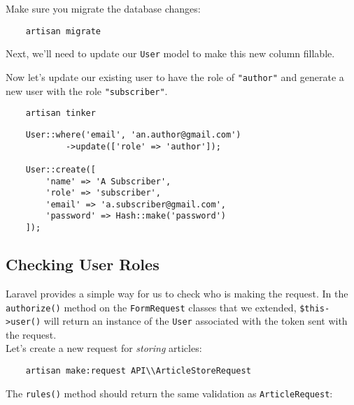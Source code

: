 Make sure you migrate the database changes:

\begin{verbatim}
    artisan migrate
\end{verbatim}

\pagebreak

Next, we'll need to update our \texttt{User} model to make this new column fillable.


Now let's update our existing user to have the role of \texttt{"author"} and generate a new user with the role \texttt{"subscriber"}.

\begin{verbatim}
    artisan tinker
\end{verbatim}

\begin{verbatim}
    User::where('email', 'an.author@gmail.com')
            ->update(['role' => 'author']);

    User::create([
        'name' => 'A Subscriber',
        'role' => 'subscriber',
        'email' => 'a.subscriber@gmail.com',
        'password' => Hash::make('password')
    ]);
\end{verbatim}


\subsection{Checking User Roles}

Laravel provides a simple way for us to check who is making the request. In the \texttt{authorize()} method on the \texttt{FormRequest} classes that we extended, \texttt{\$this->user()} will return an instance of the \texttt{User} associated with the token sent with the request.
\\

Let's create a new request for \textit{storing} articles:

\begin{verbatim}
    artisan make:request API\\ArticleStoreRequest
\end{verbatim}

\pagebreak

The \texttt{rules()} method should return the same validation as \texttt{ArticleRequest}:


